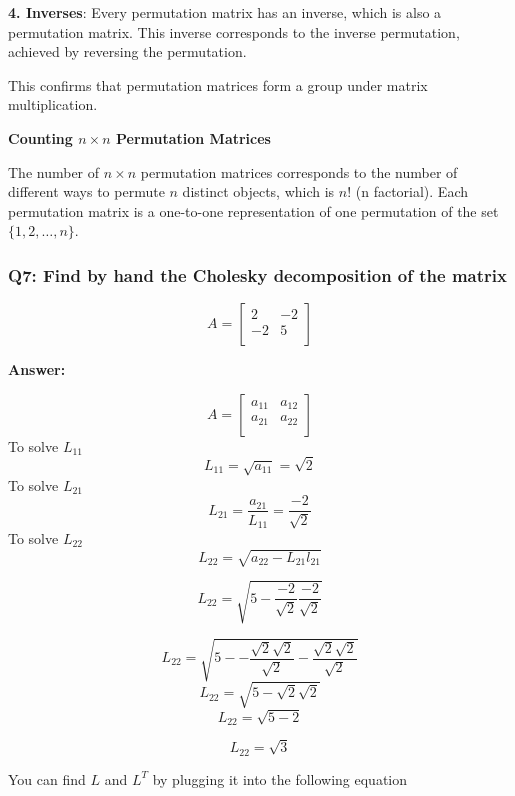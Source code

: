 \documentclass[8pt]{article}
\begin{document}
\textbf{4. Inverses}: Every permutation matrix has an inverse, which is also a permutation matrix. This inverse corresponds to the inverse permutation, achieved by reversing the permutation.

This confirms that permutation matrices form a group under matrix multiplication.

\textbf{Counting \(n \times n\) Permutation Matrices}

The number of \(n \times n\) permutation matrices corresponds to the number of different ways to permute \(n\) distinct objects, which is \(n!\) (n factorial). Each permutation matrix is a one-to-one representation of one permutation of the set \(\{1, 2, \ldots, n\}\).



\subsubsection*{Q7: Find by hand the Cholesky decomposition of the matrix}
 \[
   A=
  \left[ {\begin{array}{cc}
   2 & -2 \\
   -2 & 5 \\
  \end{array} } \right]
\]

\textbf{Answer:}

 \[
   A=
  \left[ {\begin{array}{cc}
   a_{11} & a_{12} \\
   a_{21} & a_{22} \\
  \end{array} } \right]
\]
To solve $L_{11}$
\[
L_{11} = \sqrt{a_{11}} = \sqrt{2}
\]
To solve $L_{21}$
\[
L_{21} = \frac{a_{21}}{L_{11}} = \frac{-2}{\sqrt{2}}
\]
To solve $L_{22}$
\[
L_{22} = \sqrt{a_{22} - L_{21}l_{21}}
\]

\[
L_{22} = \sqrt{5 - \frac{-2}{\sqrt{2}} \frac{-2}{\sqrt{2}}}
\]

\[
L_{22} = \sqrt{5 - -\frac{\sqrt{2}\sqrt{2}}{\sqrt{2}} -\frac{\sqrt{2}\sqrt{2}}{\sqrt{2}}}
\]
\[
L_{22} = \sqrt{5 - \sqrt{2}\sqrt{2}}
\]
\[
L_{22} = \sqrt{5 - 2}
\]

\[
L_{22} = \sqrt{3}
\]

You can find $L$ and $L^T$ by plugging it into the following equation 
\end{document}
